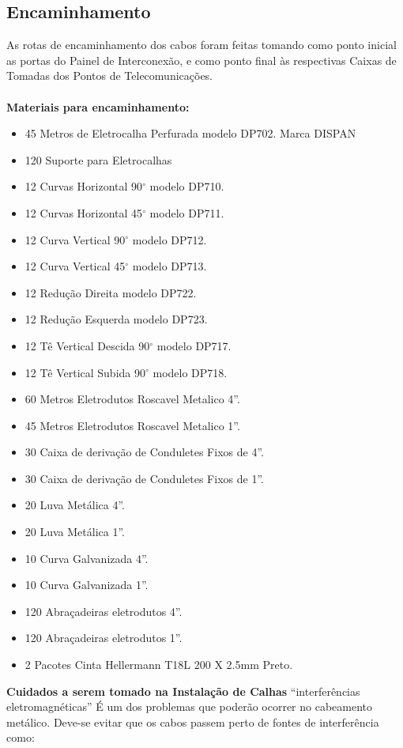 \documentclass[	DIV=calc,%
paper=a4,%
fontsize=12pt,%
onecolumn]{scrartcl}	 					%
\begin{document}
	\subsection{Encaminhamento}
	As rotas de encaminhamento dos cabos foram feitas tomando como ponto inicial as portas do Painel de Interconexão, e como ponto final às respectivas Caixas de Tomadas dos Pontos de Telecomunicações.
	\\
	\\
	\textbf{Materiais para encaminhamento:} 
	\begin{itemize}	
		\item 45 Metros de Eletrocalha Perfurada modelo DP702. Marca DISPAN
		\item 120 Suporte para Eletrocalhas
		\item 12 Curvas Horizontal 90$^\circ$ modelo DP710.
		\item 12 Curvas Horizontal 45$^\circ$  modelo DP711.
		\item 12 Curva Vertical 90$^\circ$ modelo DP712.
		\item 12 Curva Vertical 45$^\circ$  modelo DP713.
		\item 12 Redução Direita modelo DP722.
		\item 12 Redução Esquerda modelo DP723.
		\item 12 Tê Vertical Descida 90$^\circ$ modelo DP717.
		\item 12 Tê Vertical Subida 90$^\circ$ modelo DP718.
		\item 60 Metros Eletrodutos  Roscavel Metalico  4”.
		\item 45 Metros Eletrodutos  Roscavel Metalico  1”.
		\item 30 Caixa de derivação de Conduletes Fixos de 4”.
		\item 30 Caixa de derivação de Conduletes Fixos de 1”.
		\item 20 Luva Metálica 4”.
		\item 20 Luva Metálica 1”.
		\item 10 Curva Galvanizada 4”.
		\item 10 Curva Galvanizada 1”.
		\item 120 Abraçadeiras eletrodutos 4”.
		\item 120 Abraçadeiras eletrodutos 1”.
		\item 2 Pacotes Cinta Hellermann T18L 200 X 2.5mm Preto.
	\end{itemize}
	\textbf{Cuidados a serem tomado na Instalação de Calhas}  “interferências eletromagnéticas”
	É um dos problemas que poderão ocorrer no cabeamento metálico. Deve-se evitar que os cabos passem perto de fontes de interferência como: 
\end{document}
